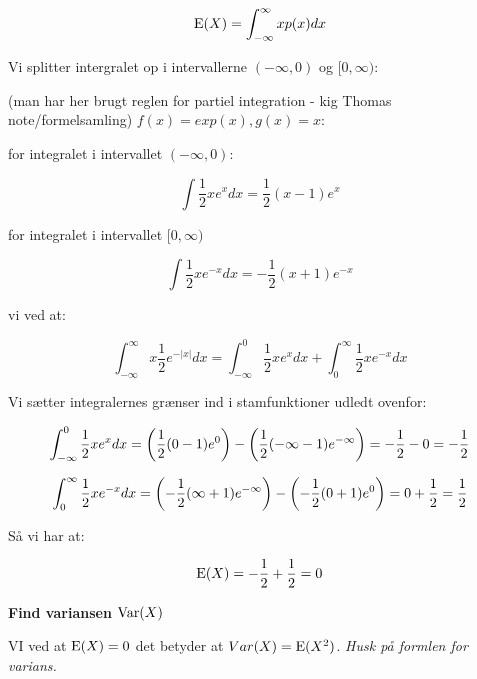 \begin{equation}
    \text{E}(X) = \int_{-\infty}^{\infty} x p(x) dx
\end{equation}

Vi splitter intergralet op i intervallerne $(-\infty,0)$ og $[0, \infty)$:


(man har her brugt reglen for partiel integration - kig Thomas note/formelsamling) $f(x) = exp(x), g(x) = x$:

for integralet i intervallet $(-\infty,0)$:

\begin{equation}
    \int \frac{1}{2} x e^{x} dx = \frac{1}{2}  (x - 1) e^{x}
\end{equation}

for integralet i intervallet $[0, \infty)$

\begin{equation}
   \int \frac{1}{2} x e^{-x} dx=  - \frac{1}{2}  (x + 1) e^{-x} 
\end{equation}

vi ved at:

\begin{equation}
    \int_{-\infty}^{\infty}  x \frac{1}{2} e^{- \lvert x \rvert} dx = \int_{-\infty}^{0} \frac{1}{2} x e^{x} dx + \int_{0}^{\infty} \frac{1}{2} x e^{-x} dx
\end{equation}

Vi sætter integralernes grænser ind i stamfunktioner udledt ovenfor:


\begin{align}
    \int_{-\infty}^{0} \frac{1}{2} x e^{x} dx = \left( \frac{1}{2}  (0 - 1) e^{0} \right) - \left( \frac{1}{2}  (- \infty - 1) e^{- \infty} \right) = -\frac{1}{2} - 0 = -\frac{1}{2} 
\end{align}

\begin{equation}
    \int_{0}^{\infty} \frac{1}{2} x e^{-x} dx = 
    \left( - \frac{1}{2}  (\infty + 1) e^{-\infty} \right) - \left(  - \frac{1}{2}  (0 + 1) e^{0}\right) = 0 + \frac{1}{2} = \frac{1}{2}
\end{equation}

Så vi har at:

\begin{equation}
    \text{E}(X) = - \frac{1}{2} + \frac{1}{2} = 0
\end{equation}

\textbf{Find variansen $\text{Var}(X) $}

VI ved at $\text{E}(X) = 0$ det betyder at $Var(X) = \text{E}(X^2)$. \textit{Husk på formlen for varians.}


